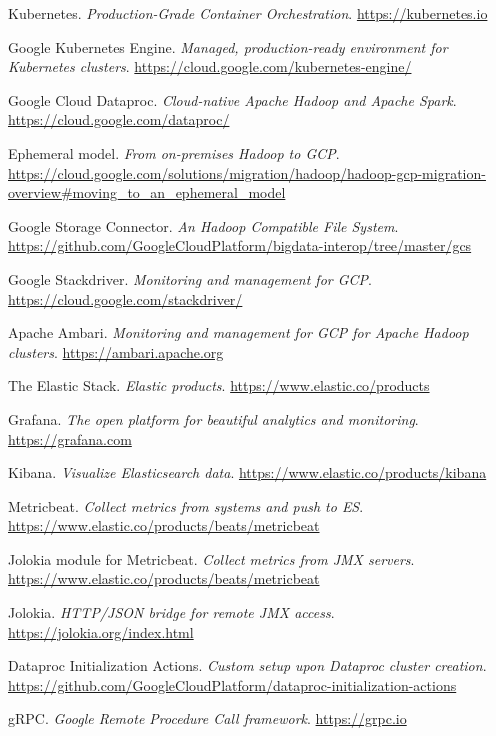 \documentclass[12pt,twoside,cucitura]{toptesi}
\begin{document}
\begin{thebibliography}{9}
Kubernetes. 
\textit{Production-Grade Container Orchestration}.
\url{https://kubernetes.io}

Google Kubernetes Engine. 
\textit{Managed, production-ready environment for Kubernetes clusters}.
\url{https://cloud.google.com/kubernetes-engine/}

Google Cloud Dataproc. 
\textit{Cloud-native Apache Hadoop and Apache Spark}.
\url{https://cloud.google.com/dataproc/}

Ephemeral model. 
\textit{From on-premises Hadoop to GCP}.
\url{https://cloud.google.com/solutions/migration/hadoop/hadoop-gcp-migration-overview#moving_to_an_ephemeral_model}

Google Storage Connector. 
\textit{An Hadoop Compatible File System}.
\url{https://github.com/GoogleCloudPlatform/bigdata-interop/tree/master/gcs}

Google Stackdriver. 
\textit{Monitoring and management for GCP}.
\url{https://cloud.google.com/stackdriver/}

Apache Ambari. 
\textit{Monitoring and management for GCP for Apache Hadoop clusters}.
\url{https://ambari.apache.org}

The Elastic Stack. 
\textit{Elastic products}.
\url{https://www.elastic.co/products}

Grafana. 
\textit{The open platform for beautiful analytics and monitoring}.
\url{https://grafana.com}

Kibana. 
\textit{Visualize Elasticsearch data}.
\url{https://www.elastic.co/products/kibana}

Metricbeat. 
\textit{Collect metrics from systems and push to ES}.
\url{https://www.elastic.co/products/beats/metricbeat}

Jolokia module for Metricbeat. 
\textit{Collect metrics from JMX servers}.
\url{https://www.elastic.co/products/beats/metricbeat}

Jolokia. 
\textit{HTTP/JSON bridge for remote JMX access}.
\url{https://jolokia.org/index.html}

Dataproc Initialization Actions. 
\textit{Custom setup upon Dataproc cluster creation}.
\url{https://github.com/GoogleCloudPlatform/dataproc-initialization-actions}

gRPC. 
\textit{Google Remote Procedure Call framework}.
\url{https://grpc.io}


\end{thebibliography}
\end{document}

